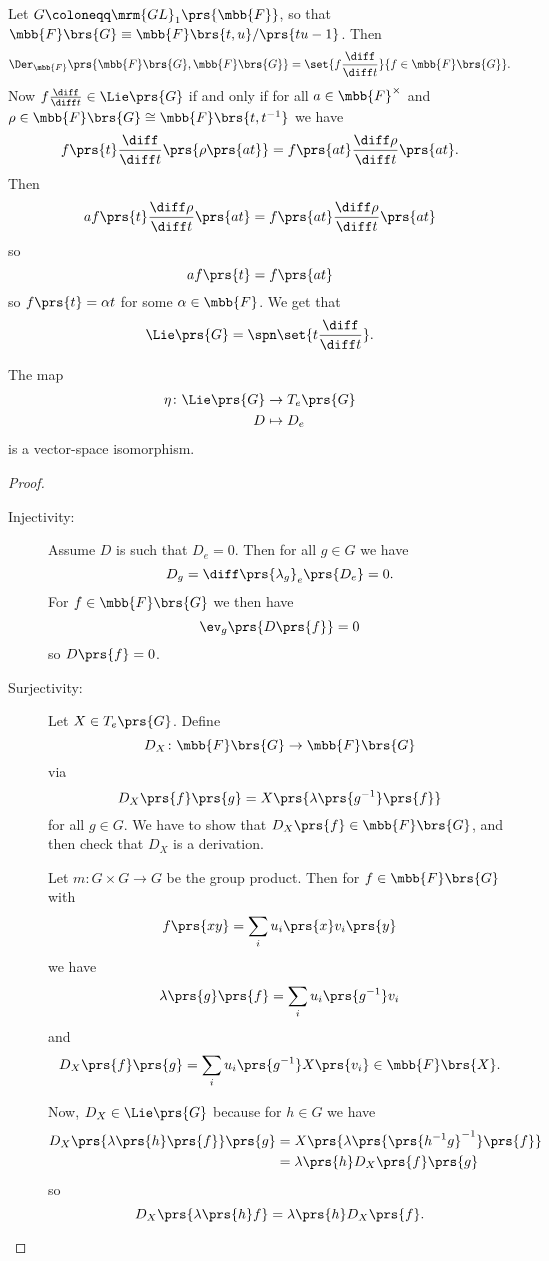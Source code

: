 \documentclass[10pt,a4paper,twoside,openany,hidelinks]{book}
\begin{document}
\begin{example}
Let $G \coloneqq \mrm{GL}_1\prs{\mbb{F}}$, so that $\mbb{F}\brs{G} \equiv \mbb{F}\brs{t,u} / \prs{tu - 1}$.
Then
\[\Der_{\mbb{F}}\prs{\mbb{F}\brs{G}, \mbb{F}\brs{G}} = \set{f \frac{\diff}{\diff t}}{f \in \mbb{F}\brs{G}} \text{.}\]
Now $f \frac{\diff}{\diff t} \in \Lie\prs{G}$ if and only if for all $a \in \mbb{F}^\times$ and $\rho \in \mbb{F}\brs{G} \cong \mbb{F}\brs{t,t^{-1}}$ we have
\[f\prs{t} \frac{\diff}{\diff t}\prs{\rho\prs{at}} = f\prs{at} \frac{\diff \rho}{\diff t}\prs{at} \text{.}\]
Then
\[a f\prs{t} \frac{\diff \rho}{\diff t}\prs{at} = f\prs{at} \frac{\diff \rho}{\diff t}\prs{at}\]
so
\[a f\prs{t} = f\prs{at}\]
so $f\prs{t} = \alpha t$ for some $\alpha \in \mbb{F}$.
We get that
\[\Lie\prs{G} = \spn\set{t \frac{\diff}{\diff t}} \text{.}\]
\end{example}

\begin{proposition}
The map
\begin{align*}
\eta \colon \Lie\prs{G} &\to T_e\prs{G} \\
D &\mapsto D_e
\end{align*}
is a vector-space isomorphism.
\end{proposition}


\begin{proof}
\begin{description}
\item[Injectivity:]
Assume $D$ is such that $D_e = 0$. Then for all $g \in G$ we have
\[D_g = \diff\prs{\lambda_g}_e \prs{D_e} = 0 \text{.}\]
For $f \in \mbb{F}\brs{G}$ we then have
\[\ev_g\prs{D\prs{f}} = 0\]
so $D\prs{f} = 0$.

\item[Surjectivity:]

Let $X \in T_e\prs{G}$. Define
\[D_X \colon \mbb{F}\brs{G} \to \mbb{F}\brs{G}\]
via
\[D_X\prs{f}\prs{g} = X\prs{\lambda\prs{g^{-1}}\prs{f}}\]
for all $g \in G$.
We have to show that $D_X\prs{f} \in \mbb{F}\brs{G}$, and then check that $D_X$ is a derivation.

Let $m \colon G \times G \to G$ be the group product. Then for $f \in \mbb{F}\brs{G}$ with
\[f\prs{xy} = \sum_i u_i\prs{x} v_i\prs{y}\]
we have
\[\lambda\prs{g}\prs{f} = \sum_i u_i\prs{g^{-1}} v_i\]
and
\begin{align*}
D_X\prs{f}\prs{g} = \sum_i u_i\prs{g^{-1}} X\prs{v_i} \in \mbb{F}\brs{X} \text{.}
\end{align*}

Now, $D_X \in \Lie\prs{G}$ because for $h \in G$ we have
\begin{align*}
D_X\prs{\lambda\prs{h}\prs{f}}\prs{g} &= X\prs{\lambda\prs{\prs{h^{-1} g}^{-1}}\prs{f}}
\\&= \lambda\prs{h} D_X\prs{f} \prs{g}
\end{align*}
so \[D_X\prs{\lambda\prs{h} f} = \lambda\prs{h} D_X\prs{f} \text{.}\]


\end{description}
\end{proof}
\end{document}
